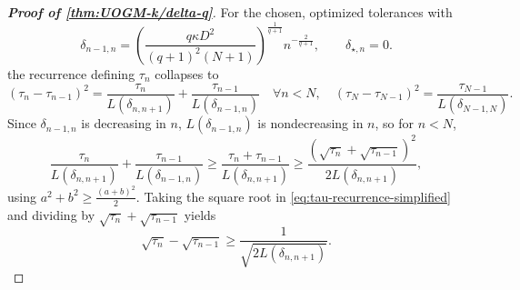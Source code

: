 \documentclass[11pt, hidelinks]{article}
\numberwithin{equation}{section}
\theoremstyle{thmstyletwo}%
\numberwithin{equation}{section}
\begin{document}
\begin{proof}[\bf Proof of \cref{thm:UOGM-k/delta-q}]
    For the chosen, optimized tolerances with
\begin{equation}\label{eq:c_0}
 \delta_{n-1,n} = \left(\frac{q\kappa D^2}{(q+1)^2(N+1)}\right)^\frac{1}{q+1}{n^{-\frac{2}{q+1}}}, \qquad
    \delta_{\star, n} = 0.
\end{equation}
the recurrence defining $\tau_n$ collapses to
\begin{equation}\label{eq:tau-recurrence-simplified}
(\tau_n-\tau_{n-1})^2=\frac{\tau_n}{L(\delta_{n,n+1})}+\frac{\tau_{n-1}}{L(\delta_{n-1,n})}\quad \forall n < N,\quad (\tau_N-\tau_{N-1})^2=\frac{\tau_{N-1}}{L(\delta_{N-1,N})}.
\end{equation}
Since $\delta_{n-1,n}$ is decreasing in $n$, $L(\delta_{n-1,n})$ is nondecreasing in $n$, so for $n<N$,
$$
\frac{\tau_n}{L(\delta_{n,n+1})}+\frac{\tau_{n-1}}{L(\delta_{n-1,n})} \geq \frac{\tau_n+\tau_{n-1}}{L(\delta_{n,n+1})}\geq \frac{\left(\sqrt{\tau_n}+\sqrt{\tau_{n-1}}\right)^2}{2L(\delta_{n,n+1})},
$$
using $a^2+b^2\ge\frac{(a+b)^2}{2}$. Taking the square root in \eqref{eq:tau-recurrence-simplified} and dividing by $\sqrt{\tau_n}+\sqrt{\tau_{n-1}}$ yields
\begin{equation}\label{eq:sqrt-tau-lower}
\sqrt{\tau_n}-\sqrt{\tau_{n-1}}\geq \frac{1}{\sqrt{2L(\delta_{n,n+1})}}.
\end{equation}


\end{proof}
\end{document}
